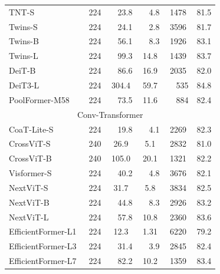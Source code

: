 \documentclass[10pt,twocolumn,letterpaper]{article}
\begin{document}
\begin{table}[t]
{{\begin{tabular}[t]{lccccc}
TNT-S~\cite{han2021transformer} & 224 &\ \  23.8 &\ \  4.8 & 1478 & 81.5\\
Twins-S~\cite{chu2021twins} & 224 &\ \  24.1 &\ \  2.8 & 3596 & 81.7\\
Twins-B~\cite{chu2021twins} & 224 &\ \  56.1 &\ \  8.3 & 1926 & 83.1\\
Twins-L~\cite{chu2021twins} & 224 &\ \  99.3 & 14.8 & 1439 & 83.7\\
DeiT-B~\cite{touvron2021training} & 224 &\ \  86.6 & 16.9 & 2035 & 82.0\\
DeiT3-L~\cite{touvron2022deit} & 224 & 304.4 & 59.7 &\ \ 535  & 84.8	\\
PoolFormer-M58~\cite{yu2022metaformer} & 224 &\ \  73.5 & 11.6 &\ \  884 & 82.4\\
\midrule
\multicolumn{6}{c}{Conv-Transformer} \\
\midrule
CoaT-Lite-S~\cite{xu2021co} & 224 &\ \  19.8 & \ \  4.1 & 2269 & 82.3\\
CrossViT-S~\cite{chen2021crossvit} & 240 & 26.9 & 5.1 & 2832 & 81.0\\
CrossViT-B~\cite{chen2021crossvit} & 240 & 105.0 & 20.1 & 1321 & 82.2\\
Visformer-S~\cite{chen2021visformer} & 224 &\ \  40.2 &\ \  4.8 & 3676 & 82.1\\
NextViT-S~\cite{li2022next} & 224 & 31.7 & 5.8 & 3834 & 82.5\\
NextViT-B~\cite{li2022next}  & 224 &\ \  44.8 & \ \ 8.3 & 2926 & 83.2\\
NextViT-L~\cite{li2022next} & 224 &\ \  57.8 & 10.8 & 2360 & 83.6\\
EfficientFormer-L1~\cite{li2022efficientformer} & 224 & 12.3 & 1.31 & 6220 & 79.2\\
EfficientFormer-L3~\cite{li2022efficientformer} & 224 &\ \  31.4 & \ \ 3.9 & 2845 & 82.4\\
EfficientFormer-L7~\cite{li2022efficientformer} & 224 &\ \  82.2 & 10.2 & 1359 & 83.4\\

\end{tabular}}}
\end{table}
\end{document}

